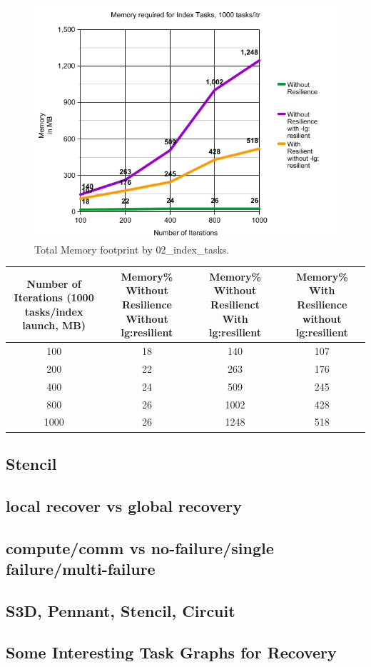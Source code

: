 \begin{figure}
\includegraphics[width=\textwidth]{images/index_tasks_memory.png}
\caption{Total Memory footprint by 02\_index\_tasks.}
\end{figure}


\begin{center}
 \begin{tabular}{||c c c c||} 
 \hline
 Number of Iterations (1000 tasks/index launch, MB) & Memory\% Without Resilience Without lg:resilient & Memory\% Without Resilienct With lg:resilient & Memory\% With Resilience without lg:resilient \\ [0.25ex] 
 \hline\hline
100 &  18 & 140 & 107 \\ 
 \hline
200 &  22 & 263 & 176 \\ 
 \hline
400 &  24 & 509 & 245 \\ 
 \hline
800 &  26 & 1002 & 428\\ 
 \hline
1000 & 26 & 1248 & 518\\ [1ex] 
 \hline
\end{tabular}
\end{center}




\subsection{Stencil}



\subsection{local recover vs global recovery}

\subsection{compute/comm vs no-failure/single failure/multi-failure}

\subsection{S3D, Pennant, Stencil, Circuit}

\subsection{Some Interesting Task Graphs for Recovery}


